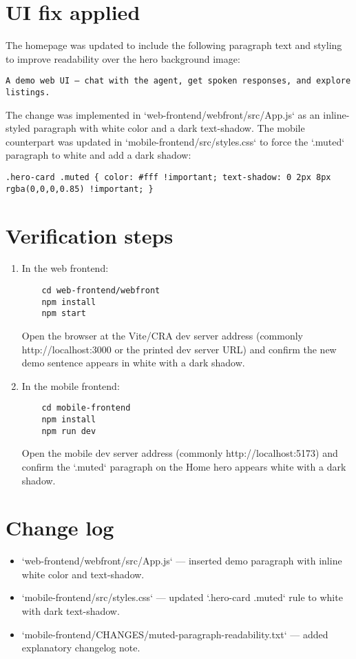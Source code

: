 \documentclass{article}
\begin{document}
\section*{UI fix applied}
The homepage was updated to include the following paragraph text and styling to improve readability over the hero background image:
\begin{verbatim}
A demo web UI — chat with the agent, get spoken responses, and explore listings.
\end{verbatim}

The change was implemented in `web-frontend/webfront/src/App.js` as an inline-styled paragraph with white color and a dark text-shadow. The mobile counterpart was updated in `mobile-frontend/src/styles.css` to force the `.muted` paragraph to white and add a dark shadow:
\begin{verbatim}
.hero-card .muted { color: #fff !important; text-shadow: 0 2px 8px rgba(0,0,0,0.85) !important; }
\end{verbatim}

\section*{Verification steps}
\begin{enumerate}
  \item In the web frontend:
    \begin{verbatim}
    cd web-frontend/webfront
    npm install
    npm start
    \end{verbatim}
    Open the browser at the Vite/CRA dev server address (commonly http://localhost:3000 or the printed dev server URL) and confirm the new demo sentence appears in white with a dark shadow.
  \item In the mobile frontend:
    \begin{verbatim}
    cd mobile-frontend
    npm install
    npm run dev
    \end{verbatim}
    Open the mobile dev server address (commonly http://localhost:5173) and confirm the `.muted` paragraph on the Home hero appears white with a dark shadow.
\end{enumerate}

\section*{Change log}
\begin{itemize}
  \item `web-frontend/webfront/src/App.js` — inserted demo paragraph with inline white color and text-shadow.
  \item `mobile-frontend/src/styles.css` — updated `.hero-card .muted` rule to white with dark text-shadow.
  \item `mobile-frontend/CHANGES/muted-paragraph-readability.txt` — added explanatory changelog note.
\end{itemize}
\end{document}

